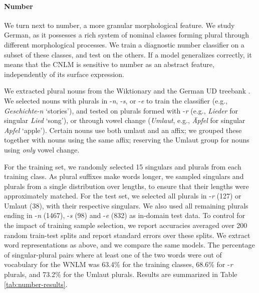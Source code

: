 \paragraph{Number}
We turn next to number, a more granular morphological feature. We
study German, as it possesses a rich system of nominal classes forming
plural through different morphological processes. We train a diagnostic number
classifier on a subset of these classes, and test on the others. If a
model generalizes correctly, it means that the CNLM is sensitive to number
as an abstract feature, independently of its surface expression.

We extracted plural nouns from the Wiktionary and the German UD
treebank \cite{mcdonald2013universal,brants2002tiger}.  We selected %
nouns with plurals in -\emph{n}, -\emph{s}, or -\emph{e} to train the classifier (e.g., \emph{Geschichte-n} `stories'), and tested on plurals formed with
-\emph{r} (e.g., \emph{Lieder} for singular \emph{Lied} `song'), or through vowel change (\emph{Umlaut}, e.g., \emph{{\"A}pfel} for singular \emph{Apfel} `apple'). 
Certain nouns use both umlaut and an affix; we grouped these together with nouns using the same affix; reserving the Umlaut group for nouns using \emph{only} vowel change.

For the training set, we randomly selected 15 singulars and plurals
from each training class.  As plural suffixes make words longer, we
sampled singulars and
plurals %
from a single distribution over lengths, to ensure that their lengths
were approximately matched.  For the test set, we selected all plurals
in -\emph{r} (127) or Umlaut (38), with their respective
singulars. %
We also used all remaining plurals ending in -\emph{n} (1467), -\emph{s} (98) and -\emph{e} (832) as in-domain test data.
To control for the impact of training sample selection, we
report accuracies averaged over 200 random train-test splits and report standard errors over these splits.  We extract word
representations as above, and we compare the same models.
The percentage of singular-plural pairs where at least one of the two words were out of vocabulary for the WNLM was 63.4\% for the training classes, 68.6\% for -\emph{r} plurals, and 73.2\% for the Umlaut plurals.
Results are summarized in Table \ref{tab:number-results}.

